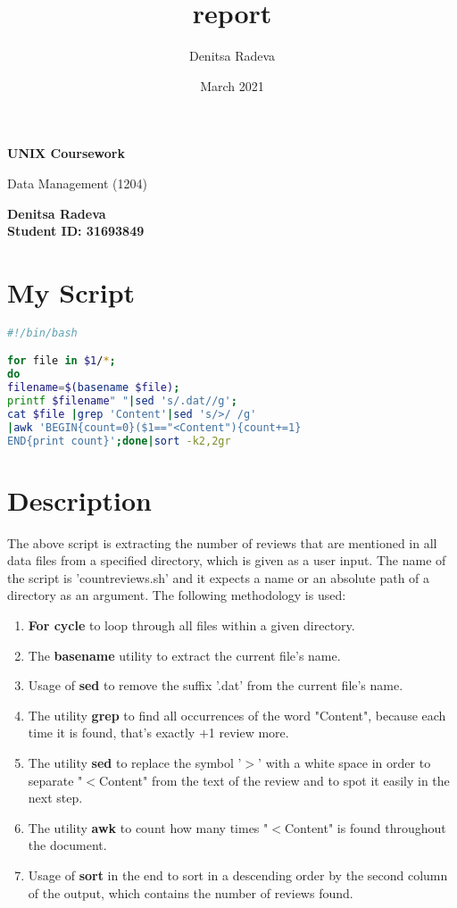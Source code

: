 \documentclass[12pt]{article}
\author{Denitsa Radeva}
\title{report}
\date{March 2021}
\begin{document}
\begin{titlepage}
   \begin{center}
       \vspace*{1cm}

       \textbf{\huge UNIX Coursework}

       \vspace{0.5cm}
        Data Management (1204)
            
       \vspace{1.5cm}

       \textbf{Denitsa Radeva\\Student ID: 31693849}
   \end{center}
\end{titlepage}

\section{My Script}
\lstset{style=codeStyle}
\begin{lstlisting}[showstringspaces=false, language=sh, caption=Extracting information from files.]
#!/bin/bash

for file in $1/*;
do
filename=$(basename $file);
printf $filename" "|sed 's/.dat//g';
cat $file |grep 'Content'|sed 's/>/ /g'
|awk 'BEGIN{count=0}($1=="<Content"){count+=1}
END{print count}';done|sort -k2,2gr
\end{lstlisting}
\section{Description}
The above script is extracting the number of reviews that are mentioned in all data files from a specified directory, which is given as a user input. The name of the script is 'countreviews.sh' and it expects a name or an absolute path of a directory as an argument. The following methodology is used:
\begin{enumerate}
	\item \textbf{For cycle} to loop through all files within a given directory.
	\item The \textbf{basename} utility to extract the current file's name.
	\item Usage of \textbf{sed} to remove the suffix '.dat' from the current file's name.
	\item The utility \textbf{grep} to find all occurrences of the word "Content", because each time it is found, that's exactly $+$1 review more.
	\item The utility \textbf{sed} to replace the symbol '$>$' with a white space in order to separate "$<$Content" from the text of the review and to spot it easily in the next step.
	\item The utility \textbf{awk} to count how many times "$<$Content" 
	is found throughout the document.
	\item Usage of \textbf{sort} in the end to sort in a descending order by the second column of the output, which contains the number of reviews found. 
\end{enumerate}
\end{document}
